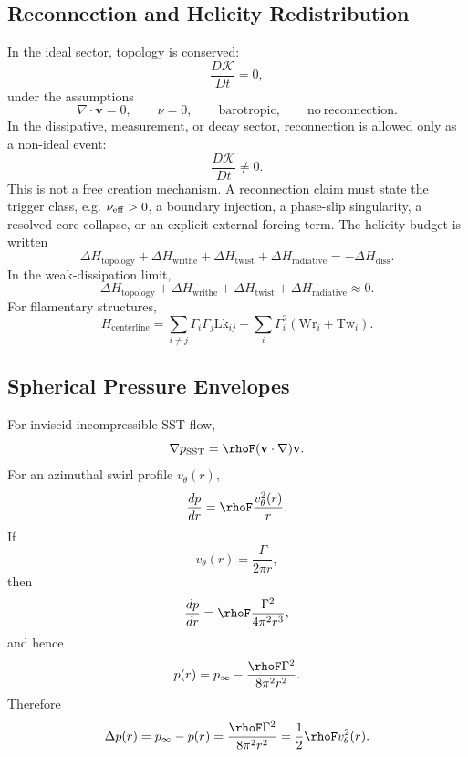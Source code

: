     \subsection{Reconnection and Helicity Redistribution}
        
        In the ideal sector, topology is conserved:
        \[
            \frac{D\mathcal K}{Dt}=0,
        \]
        under the assumptions
        \[
            \nabla\cdot\mathbf v=0,
            \qquad
            \nu=0,
            \qquad
            \mathrm{barotropic},
            \qquad
            \mathrm{no\ reconnection}.
        \]
        In the dissipative, measurement, or decay sector, reconnection is allowed only as a non-ideal event:
        \[
            \frac{D\mathcal K}{Dt}\neq0.
        \]
        This is not a free creation mechanism. A reconnection claim must state the trigger class, e.g. \(\nu_{\rm eff}>0\), a boundary injection, a phase-slip singularity, a resolved-core collapse, or an explicit external forcing term.
        The helicity budget is written
        \[
            \Delta H_{\mathrm{topology}}
            +
            \Delta H_{\mathrm{writhe}}
            +
            \Delta H_{\mathrm{twist}}
            +
            \Delta H_{\mathrm{radiative}}
            =
            -\Delta H_{\mathrm{diss}}.
        \]
        In the weak-dissipation limit,
        \[
            \Delta H_{\mathrm{topology}}
            +
            \Delta H_{\mathrm{writhe}}
            +
            \Delta H_{\mathrm{twist}}
            +
            \Delta H_{\mathrm{radiative}}
            \approx
            0.
        \]
        For filamentary structures,
        \[
            H_{\mathrm{centerline}}
            =
            \sum_{i\neq j}
            \Gamma_i\Gamma_j\mathrm{Lk}_{ij}
            +
            \sum_i
            \Gamma_i^2
            \left(
                \mathrm{Wr}_i+\mathrm{Tw}_i
            \right).
        \]
    
    \subsection{Spherical Pressure Envelopes}
        
        For inviscid incompressible SST flow,
        \[
            \nabla p_{\mathrm{SST}}
            =
            \rhoF(\mathbf v\cdot\nabla)\mathbf v .
        \]
        For an azimuthal swirl profile \(v_\theta(r)\),
        \[
            \frac{dp}{dr}
            =
            \rhoF\frac{v_\theta^2(r)}{r}.
        \]
        If
        \[
            v_\theta(r)=\frac{\Gamma}{2\pi r},
        \]
        then
        \[
            \frac{dp}{dr}
            =
            \rhoF\frac{\Gamma^2}{4\pi^2r^3},
        \]
        and hence
        \[
            p(r)
            =
            p_\infty
            -
            \frac{\rhoF\Gamma^2}{8\pi^2r^2}.
        \]
        Therefore
        \[
            \Delta p(r)
            =
            p_\infty-p(r)
            =
            \frac{\rhoF\Gamma^2}{8\pi^2r^2}
            =
            \frac{1}{2}\rhoF v_\theta^2(r).
        \]
        
